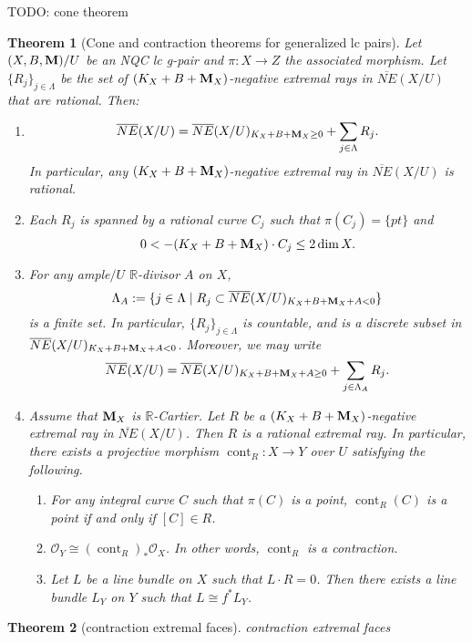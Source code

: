 \documentclass[11pt]{amsart}
\newcommand\wang[1]{\todo[color=blue!40]{#1}}
\numberwithin{equation}{section}
\newcommand{\Mm}{{\bf{M}}}
\newcommand{\Rr}{\mathbb{R}}
\newcommand{\cont}{\operatorname{cont}}
\newtheorem{thm}{Theorem}[section]
\theoremstyle{definition}
\theoremstyle{definition}
\theoremstyle{definition}
\begin{document}
TODO: cone theorem
\begin{thm}[Cone and contraction theorems for generalized lc pairs]\label{thm: cone and contraction theorem glc pair}
Let $(X,B,\Mm)/U$ be an NQC lc g-pair and $\pi: X\rightarrow Z$ the associated morphism. Let $\{R_j\}_{j\in\Lambda}$ be the set of $(K_X+B+\Mm_X)$-negative extremal rays in $\overline{NE}(X/U)$ that are rational. Then:
\begin{enumerate}
    \item $$\overline{NE}(X/U)=\overline{NE}(X/U)_{K_X+B+\Mm_X\geq 0}+\sum_{j\in\Lambda} R_j.$$
    In particular, any $(K_X+B+\Mm_X)$-negative extremal ray in $\overline{NE}(X/U)$ is rational.
    \item Each $R_j$ is spanned by a rational curve $C_j$ such that $\pi(C_j)=\{pt\}$ and 
    $$0<-(K_X+B+\Mm_X)\cdot C_j\leq 2\dim X.$$
    \item For any ample$/U$ $\Rr$-divisor $A$ on $X$,
    $$\Lambda_A:=\{j\in\Lambda\mid R_j\subset\overline{NE}(X/U)_{K_X+B+\Mm_X+A<0}\}$$
    is a finite set. In particular, $\{R_j\}_{j\in\Lambda}$ is countable, and is a discrete subset in $\overline{NE}(X/U)_{K_X+B+\Mm_X+A<0}$. Moreover, we may write
    $$\overline{NE}(X/U)=\overline{NE}(X/U)_{K_X+B+\Mm_X+A\geq 0}+\sum_{j\in\Lambda_A}R_j.$$
    \item Assume that $\Mm_X$ is $\Rr$-Cartier. Let $R$ be a $(K_X+B+\Mm_X)$-negative extremal ray in $\overline{NE}(X/U)$. Then $R$ is a rational extremal ray. In particular, there exists a projective morphism $\cont_R: X\rightarrow Y$ over $U$ satisfying the following.
    \begin{enumerate}
        \item For any integral curve $C$ such that $\pi(C)$ is a point, $\cont_R(C)$ is a point if and only if $[C]\in R$.
        \item $\mathcal{O}_Y\cong(\cont_R)_*\mathcal{O}_X$. In other words, $\cont_R$ is a contraction.
        \item Let $L$ be a line bundle on $X$ such that $L\cdot R=0$. Then there exists a line bundle $L_Y$ on $Y$ such that $L\cong f^*L_Y$.
    \end{enumerate}
\end{enumerate}
\end{thm}

\begin{thm}[contraction extremal faces]\label{thm: contraction extremal face glc}
  contraction extremal faces\wang{Is this true?}
\end{thm}
\end{document}
